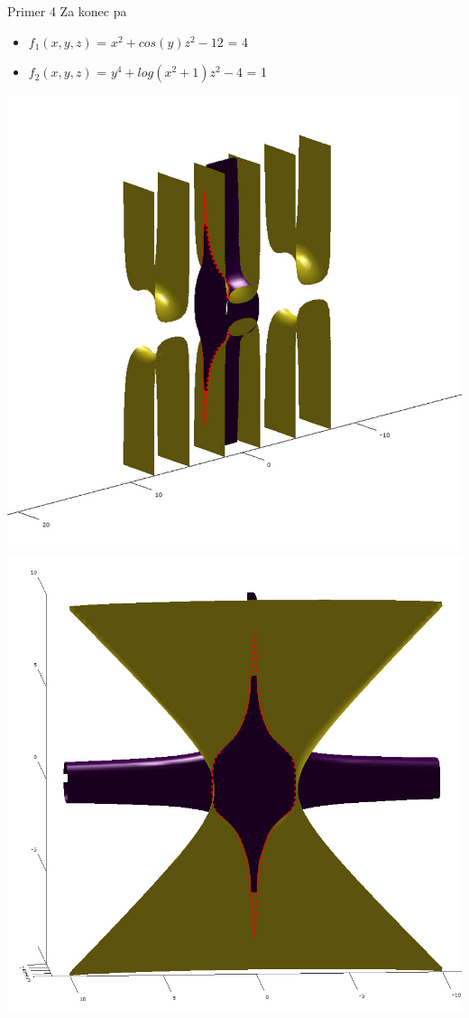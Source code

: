 \documentclass{beamer}
\begin{document}
\begin{frame}{Primer 4}
	Za konec pa\\
	
	\begin{itemize}  
		\item $f_{1}(x,y,z)$ = $x^2 + cos(y)z^2 - 12$ = 4
		\item $f_{2}(x,y,z)$ = $y^4 + log(x^2 + 1)z^2 - 4$ = 1
	\end{itemize} 
	\includegraphics[scale=0.3]{primer4_1}
	\includegraphics[scale=0.3]{primer4_2}
\end{frame}
\end{document}
